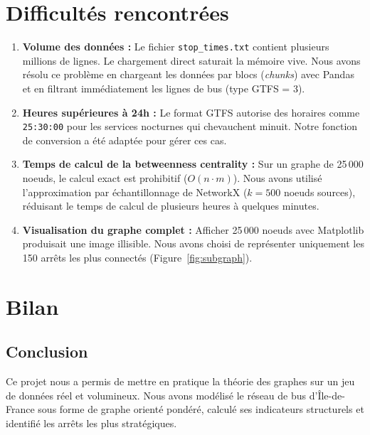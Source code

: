 \documentclass[a4paper, 12pt, twoside]{article}
\begin{document}
\section{Difficultés rencontrées}

\begin{enumerate}
    \item \textbf{Volume des données :} Le fichier \texttt{stop\_times.txt} contient plusieurs millions de lignes. Le chargement direct saturait la mémoire vive. Nous avons résolu ce problème en chargeant les données par blocs (\textit{chunks}) avec Pandas et en filtrant immédiatement les lignes de bus (type GTFS = 3).

    \item \textbf{Heures supérieures à 24h :} Le format GTFS autorise des horaires comme \texttt{25:30:00} pour les services nocturnes qui chevauchent minuit. Notre fonction de conversion a été adaptée pour gérer ces cas.

    \item \textbf{Temps de calcul de la betweenness centrality :} Sur un graphe de 25\,000 noeuds, le calcul exact est prohibitif ($O(n \cdot m)$). Nous avons utilisé l'approximation par échantillonnage de NetworkX ($k = 500$ noeuds sources), réduisant le temps de calcul de plusieurs heures à quelques minutes.

    \item \textbf{Visualisation du graphe complet :} Afficher 25\,000 noeuds avec Matplotlib produisait une image illisible. Nous avons choisi de représenter uniquement les 150 arrêts les plus connectés (Figure~\ref{fig:subgraph}).
\end{enumerate}

\section{Bilan}

	\subsection{Conclusion}

	Ce projet nous a permis de mettre en pratique la théorie des graphes sur un jeu de données réel et volumineux. Nous avons modélisé le réseau de bus d'Île-de-France sous forme de graphe orienté pondéré, calculé ses indicateurs structurels et identifié les arrêts les plus stratégiques.
\end{document}
